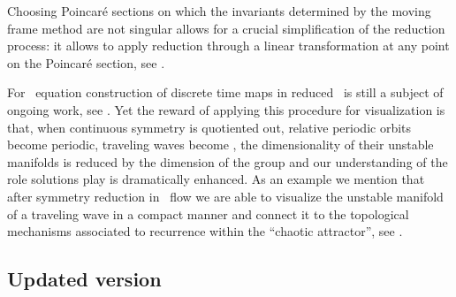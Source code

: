 Choosing Poincar\'e sections on which the invariants
determined by the moving frame method are not singular allows for a crucial simplification of the reduction
process: it allows to apply reduction through a linear transformation at any point on the Poincar\'e section,
see .

For \KS\ equation construction of discrete time maps in reduced \statesp\ is still a subject of ongoing
work, see . Yet the reward of applying this procedure for visualization
is that, when continuous symmetry is quotiented out, relative periodic
orbits become periodic, traveling waves become \eqva, the dimensionality of their unstable manifolds
is reduced by the dimension of the group and our understanding of the role solutions play is dramatically
enhanced.
\ESedit
{As an example we mention that after symmetry reduction in \KS\ flow we are able to visualize the unstable
manifold of a traveling wave in a compact manner and connect it to the topological mechanisms associated
to recurrence within the ``chaotic attractor'', see .}

\subsection{Updated version}

